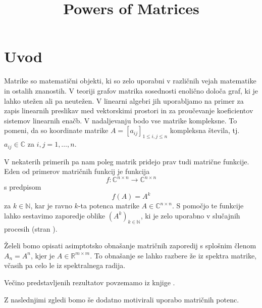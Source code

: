 \documentclass[mat1]{fmfdelo}
\title{Powers of Matrices}
\newcommand{\R}{\mathbb R}
\newcommand{\N}{\mathbb N}
\newcommand{\C}{\mathbb C}
\begin{document}
\section{Uvod}
Matrike so matematični objekti, ki so zelo uporabni v različnih vejah matematike in ostalih znanostih. V teoriji grafov matrika sosednosti enolično določa graf, ki je lahko utežen ali pa neutežen. V linearni algebri jih uporabljamo na primer za zapis linearnih preslikav med vektorskimi prostori in za proučevanje koeficientov sistemov linearnih enačb. V nadaljevanju bodo vse matrike kompleksne. To pomeni, da so koordinate matrike $A = [a_{ij}]_{1 \leq i,j \leq n}$ kompleksna števila, tj.\ $a_{ij} \in \C$ za $i,j = 1, \ldots, n$.

V nekaterih primerih pa nam poleg matrik pridejo prav tudi matrične funkcije. Eden od primerov matričnih funkcij je funkcija
\[f: \C^{n\times n} \rightarrow \C^{n\times n}\] s predpisom
\[f(A) = A^k\]
za $k\in\N$, kar je ravno $k$-ta potenca matrike $A\in\C^{n\times n}$. S pomočjo te funkcije lahko sestavimo zaporedje oblike $\left(A^k\right)_{k \in \N}$, ki je zelo uporabno v slučajnih procesih (stran \pageref{definicijaMarkov}).

Želeli bomo opisati asimptotsko obnašanje matričnih zaporedij s splošnim členom $A_n = A^n$, kjer je $A \in \R^{m \times m}$. To obnašanje se lahko razbere že iz spektra matrike, včasih pa celo le iz spektralnega radija.

Večino predstavljenih rezultatov povzemamo iz knjige \cite[2.~poglavje, 3.~poglavje, dod.~A]{kramar}.

Z naslednjimi zgledi bomo še dodatno motivirali uporabo matričnih potenc.
\end{document}
